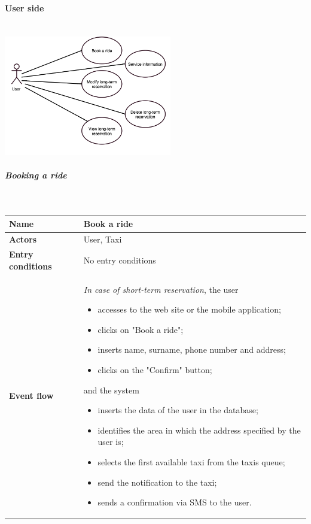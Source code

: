 \newpage
\paragraph{User side}
	\begin{center}
	~\\
\includegraphics[width=0.55\textwidth]{./images/UseCaseUser.png}~
	\end{center}
\subparagraph{Booking a ride}
~\\[0.2cm]
	\vspace{20pt}
\noindent
\begin{tabular}{l l}
 \textbf {Name} & Book a ride  \\ \hline
 \textbf{Actors} & User, Taxi \\ \hline
 \textbf{Entry conditions} & No entry conditions \\ \hline
 \textbf{Event flow} & 
 \parbox{0.7\textwidth}{
 \emph{In case of short-term reservation}, the user
 \begin{itemize}
 \item accesses to the web site or the mobile application;
 \item clicks on "Book a ride";
 \item inserts name, surname, phone number and address;
 \item clicks on the "Confirm" button;
 \end{itemize}
 and the system
 \begin{itemize}
 \item inserts the data of the user in the database;
 \item identifies the area in which the address specified by the user is;
 \item selects the first available taxi from the taxis queue;
 \item send the notification to the taxi;
 \item sends a confirmation via SMS to the user.
 \end{itemize}
  }
 \end{tabular}

